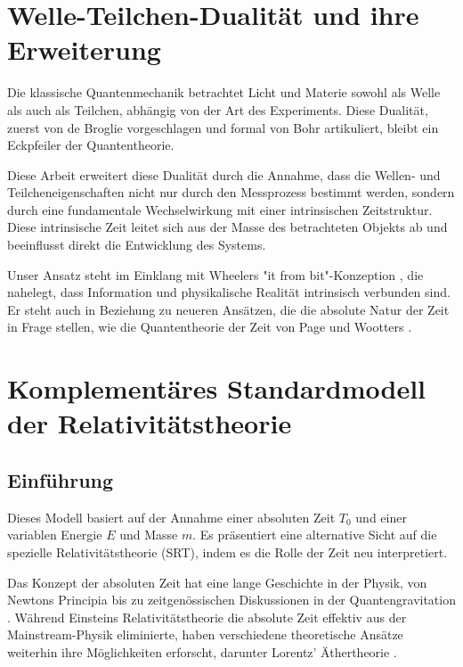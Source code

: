 \documentclass[a4paper,12pt]{article}
\newcommand{\Tzero}{T_0}
\begin{document}
	\section{Welle-Teilchen-Dualität und ihre Erweiterung}
	
	Die klassische Quantenmechanik betrachtet Licht und Materie sowohl als Welle als auch als Teilchen, abhängig von der Art des Experiments. Diese Dualität, zuerst von de Broglie \cite{deBroglie1923} vorgeschlagen und formal von Bohr \cite{Bohr1928} artikuliert, bleibt ein Eckpfeiler der Quantentheorie.
	
	Diese Arbeit erweitert diese Dualität durch die Annahme, dass die Wellen- und Teilcheneigenschaften nicht nur durch den Messprozess bestimmt werden, sondern durch eine fundamentale Wechselwirkung mit einer intrinsischen Zeitstruktur. Diese intrinsische Zeit leitet sich aus der Masse des betrachteten Objekts ab und beeinflusst direkt die Entwicklung des Systems.
	
	Unser Ansatz steht im Einklang mit Wheelers "it from bit"-Konzeption \cite{Wheeler1990}, die nahelegt, dass Information und physikalische Realität intrinsisch verbunden sind. Er steht auch in Beziehung zu neueren Ansätzen, die die absolute Natur der Zeit in Frage stellen, wie die Quantentheorie der Zeit von Page und Wootters \cite{Page1983}.
	
	\section{Komplementäres Standardmodell der Relativitätstheorie}
	
	\subsection{Einführung}
	Dieses Modell basiert auf der Annahme einer absoluten Zeit $\Tzero$ und einer variablen Energie $E$ und Masse $m$. Es präsentiert eine alternative Sicht auf die spezielle Relativitätstheorie (SRT), indem es die Rolle der Zeit neu interpretiert.
	
	Das Konzept der absoluten Zeit hat eine lange Geschichte in der Physik, von Newtons Principia \cite{Newton1687} bis zu zeitgenössischen Diskussionen in der Quantengravitation \cite{Anderson2010}. Während Einsteins Relativitätstheorie \cite{Einstein1905} die absolute Zeit effektiv aus der Mainstream-Physik eliminierte, haben verschiedene theoretische Ansätze weiterhin ihre Möglichkeiten erforscht, darunter Lorentz' Äthertheorie \cite{Lorentz1904}.
	
\end{document}
